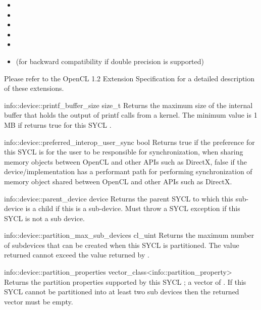 {  \begin{itemize}
    \item {}
    \item {}
    \item {}
    \item {}
    \item {}
    \item {} (for backward compatibility if
    double precision is supported)
  \end{itemize}
  Please refer to the OpenCL 1.2 Extension
  Specification for a detailed description of
  these extensions.
  }

  \addInfoRow
  {info::device::printf_buffer_size}
  {size_t}
  {
         Returns the maximum size of the internal buffer that holds the output of printf calls from a kernel. The minimum value is 1 MB if  returns true for this SYCL .
  }

  \addInfoRow
  {info::device::preferred_interop_user_sync}
  {bool}
  {
  Returns true if the preference for this SYCL  is for the user to be responsible for synchronization, when sharing memory objects between OpenCL and other APIs  such as DirectX, false if the device/implementation has a performant path for performing synchronization of memory object shared between OpenCL and other APIs such as DirectX.
  }

  \addInfoRow
  {info::device::parent_device}
  {device}
  {
  Returns the parent SYCL  to which this sub-device is a child if this is a sub-device.
  Must throw a  SYCL exception if this SYCL  is not a sub device.
  }

  \addInfoRow
  {info::device::partition_max_sub_devices}
  {cl_uint}
  {
  Returns the maximum number of subdevices that can be created when this SYCL  is partitioned. The value returned cannot exceed the value returned by .
  }

  \addInfoRow
  {info::device::partition_properties}
  {vector_class<info::partition_prop\-erty>}
  {
  Returns the partition properties supported by this SYCL ; a vector of . If this SYCL  cannot be partitioned into at least two sub devices then the returned vector must be empty.
  }


